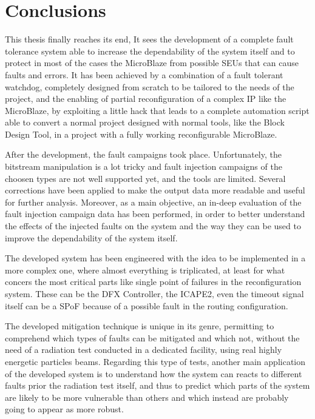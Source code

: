 \chapter{Conclusions}

This thesis finally reaches its end, It sees the development of a complete fault tolerance system able to increase the dependability of the system itself and to protect in most of the cases the MicroBlaze from possible SEUs that can cause faults and errors. It has been achieved by a combination of a fault tolerant watchdog, completely designed from scratch to be tailored to the needs of the project, and the enabling of partial reconfiguration of a complex IP like the MicroBlaze, by exploiting a little hack that leads to a complete automation script able to convert a normal project designed with normal tools, like the Block Design Tool, in a project with a fully working reconfigurable MicroBlaze.\bigskip

After the development, the fault campaigns took place. Unfortunately, the bitstream manipulation is a lot tricky and fault injection campaigns of the choosen types are not well supported yet, and the tools are limited. Several corrections have been applied to
make the output data more readable and useful for further analysis. Moreover, as a main objective, an in-deep evaluation of the fault injection campaign data has been performed, in order to better understand the effects of the injected faults on the system
and the way they can be used to improve the dependability of the system itself.\bigskip

The developed system has been engineered with the idea to be implemented in a more complex one, where almost everything is triplicated, at least for what concers the most critical parts like single point of failures in the reconfiguration system. These can be the DFX Controller, the ICAPE2, even the timeout signal itself can be a SPoF because of a possible fault in the routing configuration. \bigskip

The developed mitigation technique is unique in its genre, permitting to comprehend which types of faults can be mitigated and which not, without the need of a radiation test conducted in a dedicated facility, using real highly energetic particles beams. Regarding this type of tests, another main application of the developed system is to understand how the system can reacts to different faults prior the radiation test itself, and thus to predict which parts of the system are likely to be more vulnerable than others and which instead are probably going to appear as more robust.  

